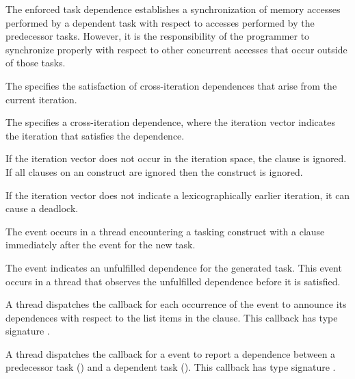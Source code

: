 \begin{note}
The enforced task dependence establishes a synchronization of memory 
accesses performed by a dependent task with respect to accesses performed by the 
predecessor tasks. However, it is the responsibility of the programmer to synchronize properly with respect to other concurrent accesses that occur outside of those tasks.
\end{note}

The   specifies the satisfaction of
cross-iteration dependences that arise from the current iteration.

The   specifies a cross-iteration dependence,
where the iteration vector  indicates the iteration that satisfies
the dependence.

If the iteration vector  does not occur in the iteration space,
the  clause is ignored.  If all  clauses on an
 construct are ignored then the construct is ignored.

\begin{note}
If the iteration vector  does not indicate a lexicographically earlier iteration, it can cause a deadlock.
\end{note}

\events

The  event occurs in a thread encountering a
tasking construct with a  clause immediately after the
 event for the new task.  

The  event indicates an unfulfilled dependence for the generated task.
This event occurs in a thread that observes the unfulfilled dependence before it is satisfied.

\tools

A thread dispatches the  callback
for each occurrence of the  event to 
announce its dependences with respect to the list items in the  clause.
This callback has type signature
.

A thread dispatches the 
callback for a  event to report a
dependence between a predecessor task  () and a dependent task
().  This callback has type signature
.

